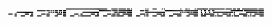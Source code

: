\documentclass[10pt]{article}
\theoremstyle{plain}
\theoremstyle{definition}
\begin{document}
\begin{table*}[b]
{\begin{minipage}{5.32in}
\[\begin{array}{@{}r@{}}
\begin{array}{@{}l@{}}
\a\a\a\a\a\a\a\a\a\a\a\a\a\a\a\a\a\a\a\a\a\a\a\a\a\a\a\a\a\a\a\a\a\a\a\a \a\a\a\a\a\a\a\a\a\a\a\a\a\a\a\a\a\a\a\a\a\a\a\a\a\a\a\a\b\b\b\b\b\b\b\b \b\b\b\b\b\b\b\b\b\b\b\b\b\b\b\b\b\b\b\b\b\b\b\b\b\b\b\b\b\b\b\b\a\a\a\a \b\b\b\b\b\b\a\b\b\b\b\b\b\b\a\b\b\b\a\b\a\a\a\a\a\a\a\a\a\a\a\a\a\b\a\b \a\a\a\a\b\b\b\b\a\a\a\a\a\b\a\b\a\a\a\a\a\a\a\a\a\a\a\a\a\a\a\b\a\a\a\a \b\b\a\b\a\a\a\a\a\b\a\b\b\b\b\b\b\b\b\b\b\b\a\b\b\b\b\b\b\b\b\b\b\b\b\b \b\b\a\b\b\b\b\b\b\a\b\b\b\a\b\b\b\a\a\b\b\b\b\b\b\b\b\b\b\b\b\b\b\b\a\b \b\b\b\b\mynl
\a\a\a\a\a\a\a\a\a\a\a\a\a\a\a\a\a\a\a\a\a\a\a\a\a\a\a\a\a\a\a\a\a\a\a\a \b\b\b\b\b\b\b\b\a\b\b\b\a\b\a\b\a\b\b\b\a\b\b\b\a\b\b\b\a\a\a\a\a\a\a\a \a\a\a\a\a\a\a\a\a\a\a\a\a\a\a\a\a\a\a\a\a\a\a\a\b\b\b\b\b\b\b\b\b\b\b\b \a\b\b\b\b\b\a\b\b\b\b\b\b\b\b\b\b\b\b\b\a\a\a\a\a\a\a\a\b\b\b\b\a\b\b\b \a\a\a\a\a\a\a\a\a\a\a\a\a\a\a\a\b\b\b\b\b\b\b\b\b\b\b\b\b\b\b\b\b\b\a\b \b\b\b\b\b\b\b\b\b\b\b\b\a\a\a\b\a\a\b\b\a\a\b\b\a\a\b\b\a\a\a\a\a\a\a\a \a\a\a\a\a\a\a\a\b\b\b\b\b\b\b\b\b\b\b\b\a\b\b\b\b\b\b\b\b\b\b\b\b\b\b\b \b\b\b\b\mynl
\a\a\a\a\a\a\a\a\a\a\a\a\a\a\a\a\b\b\b\b\b\b\b\b\b\b\b\b\b\b\b\b\a\a\a\a \a\a\a\a\a\a\a\a\a\a\a\b\a\b\a\b\a\b\b\b\a\b\a\b\a\b\b\b\a\a\a\a\a\a\a\a \a\a\a\a\a\a\a\a\b\b\b\b\b\b\b\b\b\b\b\b\b\b\b\b\a\a\a\a\a\a\a\a\a\a\a\a \a\a\a\b\b\b\a\b\b\b\b\b\b\b\a\b\b\b\b\b\a\a\a\a\a\a\a\a\a\a\a\a\a\b\b\b \b\b\b\b\b\b\b\b\b\b\b\b\b\b\b\b\a\a\a\a\a\a\a\a\a\a\a\a\a\a\a\b\a\b\a\b \a\b\b\b\a\b\a\b\b\b\b\b\a\a\a\b\a\a\a\b\a\a\a\b\a\a\a\b\b\b\b\b\b\b\b\b \b\b\b\b\b\b\b\b\b\b\a\b\a\a\a\a\a\a\a\a\a\a\a\b\b\b\b\b\b\b\b\b\b\b\a\b \b\b\b\b\mynl
\a\a\a\a\a\a\a\a\b\b\b\b\a\a\b\b\a\a\a\a\a\a\a\a\b\b\b\b\a\a\b\b\a\a\a\a \a\a\a\a\b\b\b\b\a\b\b\b\a\a\a\a\a\a\a\b\b\b\b\b\a\b\b\b\a\a\a\a\a\a\a\a \b\b\b\b\a\a\b\b\a\a\a\a\a\a\a\a\b\b\b\b\a\a\b\b\a\a\a\a\a\a\a\a\b\b\b\b \a\b\b\b\a\b\b\b\a\a\a\b\b\b\b\b\b\b\b\b\a\a\a\a\a\a\a\a\b\b\b\b\b\a\b\b \a\a\a\a\a\a\a\a\b\b\b\b\b\a\b\b\a\a\a\a\a\a\a\a\b\b\b\b\b\b\b\b\a\a\a\a \a\a\a\b\b\b\b\b\b\b\b\b\a\a\a\b\b\a\b\b\b\b\b\b\b\b\b\b\a\a\a\b\a\a\a\a \b\b\b\b\b\a\b\b\a\a\a\b\a\a\a\a\b\b\b\b\b\b\b\b\a\a\a\b\a\a\a\b\b\b\b\b \b\b\b\b\mynl
\a\a\a\a\a\a\a\a\a\a\a\a\a\a\b\b\a\a\a\a\b\b\b\b\a\a\a\a\a\b\b\b\a\a\a\a \b\b\b\b\a\a\a\a\a\b\b\b\a\a\a\a\a\b\b\b\a\a\a\a\a\b\b\b\a\a\a\a\b\b\b\b \a\a\a\a\b\a\b\b\b\b\b\b\b\b\b\b\a\a\a\a\b\b\b\b\a\a\a\a\b\b\b\b\a\a\a\a \b\b\b\b\a\b\b\b\b\b\b\b\a\a\a\a\b\b\b\b\a\a\a\a\b\b\b\b\a\a\a\a\b\a\b\b \a\a\a\a\b\b\b\b\a\a\a\a\b\b\b\b\a\a\a\a\b\b\b\b\a\a\a\a\b\b\b\b\a\a\a\a \a\b\b\b\a\a\a\a\b\b\b\b\a\a\a\b\b\b\b\b\a\a\a\a\b\b\b\b\a\b\a\b\b\b\b\b \a\a\a\a\b\b\b\b\a\b\a\b\b\b\b\b\a\a\a\a\b\b\b\b\a\b\a\b\a\b\b\b\a\a\a\a \b\b\b\b\mynl

\end{array}
\end{array}\]
\end{minipage}}
\end{table*}
\end{document}
